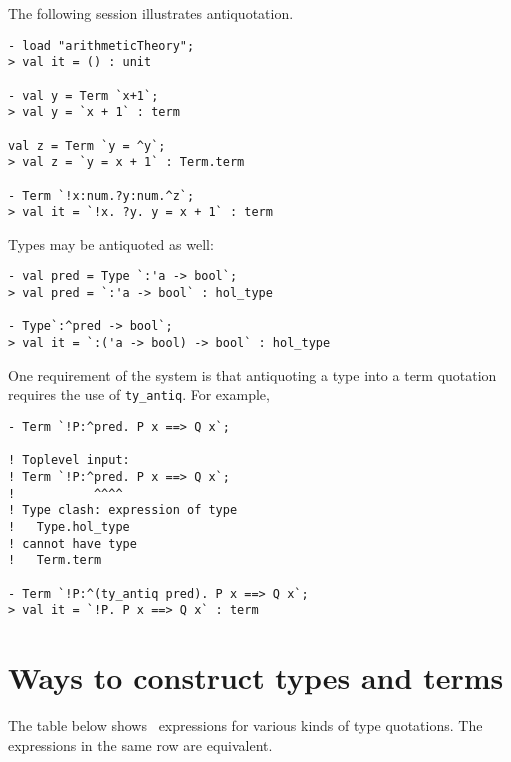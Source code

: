 The following session illustrates antiquotation.

\setcounter{sessioncount}{1}
\begin{session}\begin{verbatim}
- load "arithmeticTheory"; 
> val it = () : unit

- val y = Term `x+1`;
> val y = `x + 1` : term

val z = Term `y = ^y`;
> val z = `y = x + 1` : Term.term

- Term `!x:num.?y:num.^z`;
> val it = `!x. ?y. y = x + 1` : term
\end{verbatim}\end{session}

\noindent Types may be antiquoted as well:

\setcounter{sessioncount}{1}
\begin{session}\begin{verbatim}
- val pred = Type `:'a -> bool`;
> val pred = `:'a -> bool` : hol_type

- Type`:^pred -> bool`;
> val it = `:('a -> bool) -> bool` : hol_type
\end{verbatim}\end{session}

One requirement of the system is that antiquoting a type into a term
quotation requires the use of {\small\verb+ty_antiq+}. For example,

\begin{session}\begin{verbatim}
- Term `!P:^pred. P x ==> Q x`;

! Toplevel input:
! Term `!P:^pred. P x ==> Q x`;
!           ^^^^
! Type clash: expression of type
!   Type.hol_type
! cannot have type
!   Term.term

- Term `!P:^(ty_antiq pred). P x ==> Q x`;
> val it = `!P. P x ==> Q x` : term
\end{verbatim}\end{session}



\section{Ways to construct types and terms}

The table below shows \ML\ expressions for various kinds of type
quotations.
The expressions in the same row are equivalent.

